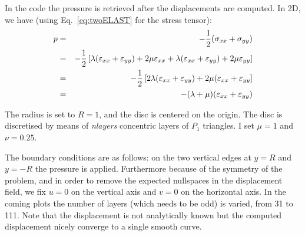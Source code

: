 In the code the pressure is retrieved after the displacements are computed. 
In 2D, we have (using Eq.~\ref{eq:twoELAST} for the stress tensor):
\begin{eqnarray}
p
&=& -\frac{1}{2}(\sigma_{xx} + \sigma_{yy}) \nonumber\\
&=& -\frac{1}{2} \left[
\lambda (\varepsilon_{xx}+\varepsilon_{yy}) + 2 \mu \varepsilon_{xx} +
\lambda (\varepsilon_{xx}+\varepsilon_{yy}) + 2 \mu \varepsilon_{yy} 
\right] \\
&=& -\frac{1}{2} \left[
2\lambda (\varepsilon_{xx}+\varepsilon_{yy}) + 2 \mu (\varepsilon_{xx} + \varepsilon_{yy} \right]\nonumber\\
&=& -(\lambda+\mu) (\varepsilon_{xx}+\varepsilon_{yy}) 
\end{eqnarray}

The radius is set to $R=1$, and the disc is centered on the origin. The disc 
is discretised by means of {\sl nlayers} concentric layers of $P_1$ triangles.
I set $\mu=1$ and $\nu=0.25$. 

The boundary conditions are as follows: on the two vertical edges at $y=R$ and $y=-R$ 
the pressure is applied. Furthermore because of the symmetry of the problem, 
and in order to remove the expected nullspaces in the displacement field, 
we fix $u=0$ on the vertical axis and $v=0$ on the horizontal axis.
In the coming plots the number of layers (which needs to be odd) is varied, from 31 to 111.
Note that the displacement is not analytically known but the computed displacement 
nicely converge to a single smooth curve.

